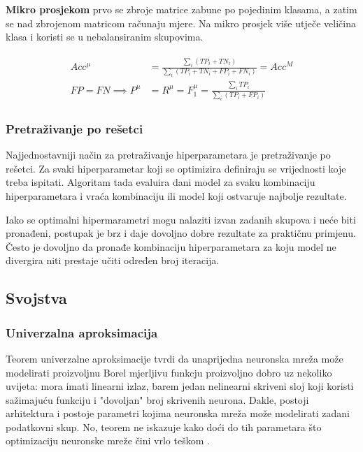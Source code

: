 \documentclass[times, utf8, numeric, diplomski]{fer}
\begin{document}
\textbf{Mikro prosjekom} prvo se zbroje matrice zabune po pojedinim klasama, a zatim se nad zbrojenom matricom računaju mjere. Na mikro prosjek više utječe veličina klasa i koristi se u nebalansiranim skupovima.

\begin{align}
\begin{split}
Acc^\mu &= \frac{\sum_i (TP_i+TN_i)}{\sum_i (TP_i+TN_i+FP_i+FN_i)} = Acc^M \\
FP = FN \implies P^\mu &= R^\mu = F_1^\mu = \frac{\sum_i TP_i}{\sum_i (TP_i+FP_i)}
\end{split}
\end{align}

\subsubsection{Pretraživanje po rešetci}
\label{sec:grid_search}
Najjednostavniji način za pretraživanje hiperparametara je pretraživanje po rešetci. Za svaki hiperparametar koji se optimizira definiraju se vrijednosti koje treba ispitati. Algoritam tada evaluira dani model za svaku kombinaciju hiperparametara i vraća kombinaciju ili model koji ostvaruje najbolje rezultate.

Iako se optimalni hipermarametri mogu nalaziti izvan zadanih skupova i neće biti pronađeni, postupak je brz i daje dovoljno dobre rezultate za praktičnu primjenu. Često je dovoljno da pronađe kombinaciju hiperparametara za koju model ne divergira niti prestaje učiti određen broj iteracija.

\subsection{Svojstva}
\label{sec:svojstva}

\subsubsection{Univerzalna aproksimacija}
Teorem univerzalne aproksimacije tvrdi da unaprijedna neuronska mreža može modelirati proizvoljnu Borel mjerljivu funkcju proizvoljno dobro uz nekoliko uvijeta: mora imati linearni izlaz, barem jedan nelinearni skriveni sloj koji koristi sažimajuću funkciju i "dovoljan" broj skrivenih neurona. Dakle, postoji arhitektura i postoje parametri kojima neuronska mreža može modelirati zadani podatkovni skup. No, teorem ne iskazuje kako doći do tih parametara što optimizaciju neuronske mreže čini vrlo teškom \citep{goodfellowbook}. 
\end{document}
